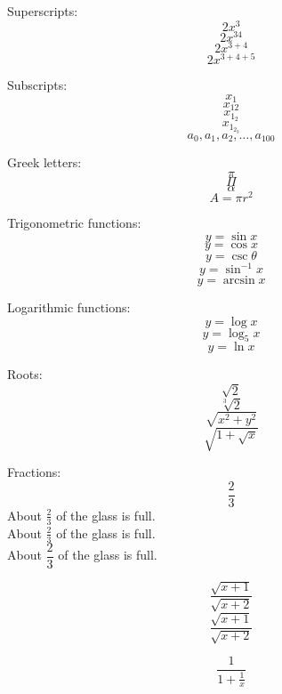 \documentclass[11pt]{article}
\begin{document}
Superscripts: \[2x^{3}\]
\[2x^{34}\]
\[2x^{3+4}\]
\[2x^{3+4+5}\]

Subscripts:
\[x_1\]
\[x_{12}\]
\[x_{1_2}\]
\[x_{1_{2_3}}\]
\[a_0, a_1, a_2, \ldots, a_{100}\]

Greek letters:
\[\pi\]
\[\Pi\]
\[\alpha\]
\[A=\pi r^2\]

Trigonometric functions:
\[y=\sin x\]
\[y=\cos x\]
\[y=\csc \theta\]
\[y= \sin^{-1} x\]
\[y=\arcsin x\]

Logarithmic functions:
\[y=\log x\]
\[y=\log_5 x\]
\[y=\ln x\]

Roots:
\[\sqrt{2}\]
\[\sqrt[3]{2}\]
\[\sqrt{x^2+y^2}\]
\[\sqrt{1+\sqrt{x}}\]

Fractions:
\[\frac{2}{3}\]
About $\displaystyle \frac{2}{3}$ of the glass is full.\\[16pt]
About $\frac{2}{3}$ of the glass is full.\\[6pt]
About $\dfrac{2}{3}$ of the glass is full.

\[\frac{\sqrt{x+1}}{\sqrt{x+2}}\]
\[\frac{\sqrt{x+1}}{\sqrt{x+2}}\]

\[\frac{1}{1+\frac{1}{x}}\]
\end{document}

